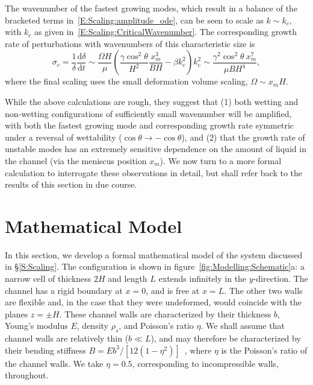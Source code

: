 \documentclass{jfm}
\newcommand{\dd}[2]{\frac{\mathrm{d} #1}{\mathrm{d} #2}}
\newcommand{\poisson}{\eta} %
\begin{document}
The wavenumber of the fastest growing modes, which result in a balance of the bracketed terms in~\eqref{E:Scaling:amplitude_ode}, can be seen to scale as $k \sim k_c$, with $k_c$ as given in~\eqref{E:Scaling:CriticalWavenumber}. The corresponding growth rate of perturbations with wavenumbers of this characteristic size is
\begin{equation}\label{E:Scaling:SigmaScaling1}
\sigma_c =  \frac{1}{\delta} \dd{\delta}{t} \sim \frac{\Omega H}{\mu}\left(\frac{\gamma \cos^2 \theta}{H^2}\frac{x_m^3}{B H} - \beta k_c^2\right)k_c^2 \sim \frac{\gamma^2 \cos^2 \theta ~ x_m^7}{\mu B H^{4}},
\end{equation}
where the final scaling uses the small deformation volume scaling, $\Omega \sim x_m H$. 

While the above calculations are rough, they suggest that (1) both wetting and non-wetting configurations of sufficiently small wavenumber will be amplified, with both the fastest growing mode and corresponding growth rate symmetric under a reversal of wettability ($\cos \theta \to -\cos \theta$), and (2) that the growth rate of unstable modes has an extremely sensitive dependence on the amount of liquid in the channel (via the meniscus position $x_m$). We now turn to a more formal calculation to interrogate these observations in detail, but shall refer back to the results of this section in due course.

\section{Mathematical Model}
In this section, we develop a formal mathematical model of the system discussed in \S\ref{S:Scaling}. The configuration is shown in figure~\ref{fig:Modelling:Schematic}a: a narrow cell of thickness $2H$ and length $L$ extends infinitely in the $y$-direction. The channel has a rigid boundary at $x = 0$, and is free at $x = L$. The other two walls are flexible and, in the case that they were undeformed, would coincide with the planes $z = \pm H$. These channel walls are characterized by their thickness $b$, Young's modulus $E$, density $\rho_s$, and Poisson's ratio $\poisson$. We shall assume that channel walls are relatively thin ($b \ll L$), and may therefore be characterized by their bending stiffness $B = Eb^3 / [12(1-\poisson^2)]$~\citep{Timoshenko1959}, where $\poisson$ is the Poisson's ratio of the channel walls. We take $\eta = 0.5$, corresponding to incompressible walls, throughout.
\end{document}
